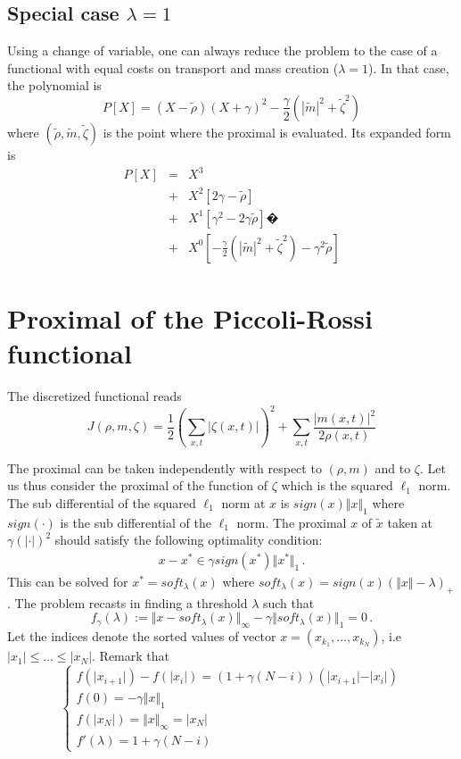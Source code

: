 \documentclass[13pt,aps,prb,preprint]{article}
\begin{document}
\subsection{Special case $\lambda=1$}
Using a change of variable, one can always reduce the problem to the case of a functional with equal costs on transport and mass creation ($\lambda =1$). In that case, the polynomial is
$$ P[X] = (X-\tilde{\rho})(X+\gamma)^2 - \frac{\gamma}{2} (|\tilde{m}|^2+\tilde{\zeta}^2) $$
where $(\tilde{\rho},\tilde{m},\tilde{\zeta})$ is the point where the proximal is evaluated. Its expanded form is
\begin{eqnarray*}
P[X] & = & X^3 \\
	& + & X^2 \left[  2\gamma -\tilde{\rho} \right] \\
	& + & X^1 \left[  \gamma^2 -2\gamma \tilde{\rho} \right]�\\
	& + & X^0 \left[  -\frac{\gamma}{2} (|\tilde{m}|^2+\tilde{\zeta}^2)-\gamma^2 \tilde{\rho} \right]
\end{eqnarray*}

\section{Proximal of the Piccoli-Rossi functional}
The discretized functional reads
\begin{equation}
J(\rho,m,\zeta) = \frac 12 \left( \sum_{x,t} |\zeta(x,t)| \right)^2  + \sum_{x,t} \frac{\vert m(x,t) \vert^2 }{2\rho(x,t)}
\end{equation}

The proximal can be taken independently with respect to $(\rho,m)$ and to $\zeta$. Let us thus consider the proximal of the function of $\zeta$ which is the squared $\ell_1$ norm. The sub differential of the squared $\ell_1$ norm at $x$ is $sign(x)\Vert x\Vert_1$ where $sign(\cdot)$ is the sub differential of the $\ell_1$ norm. The proximal $x$ of $\tilde{x}$ taken at $\gamma (|\cdot|)^2$ should satisfy the following optimality condition:
\begin{eqnarray*}
x - x^* \in \gamma sign(x^*) \Vert x^* \Vert_1 \, .
\end{eqnarray*}
This can be solved for $x^*=soft_{\lambda}(x)$ where $soft_{\lambda}(x)=sign(x) \left( \Vert x\Vert -\lambda \right)_+$. The problem recasts in finding a threshold $\lambda$ such that
$$
f_{\gamma}(\lambda) := \Vert x - soft_{\lambda}(x) \Vert_{\infty} - \gamma \Vert soft_{\lambda}(x) \Vert_1 =0 \, .
$$
Let the indices denote the sorted values of vector $x=(x_{k_1},\dots,x_{k_N})$, i.e $\vert x_1 \vert \leq \dots \leq \vert x_N \vert$. Remark that
$$
\begin{cases}
f(\vert x_{i+1} \vert) - f(\vert x_i \vert ) = \left( 1+\gamma (N-i) \right) \left( \vert x_{i+1} \vert - \vert x_i \vert  \right)\\
f(0) = -\gamma \Vert x \Vert_1\\
f(\vert x_N \vert) = \Vert x \Vert_{\infty}=\vert x_N \vert \\
f'(\lambda) = 1 + \gamma (N-i)
\end{cases}
$$
\end{document}
